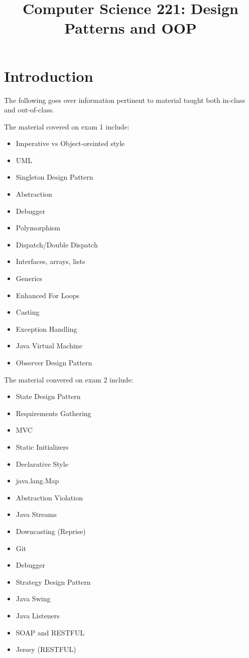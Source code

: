\documentclass[a4paper, 11pt]{article}
\begin{document}
\title{Computer Science 221: Design Patterns and OOP}

    \maketitle

\section{Introduction}

    The following goes over information pertinent to material taught both in-class and out-of-class.

    The material covered on exam 1 include:

    \begin{itemize}
        \item Imperative vs Object-oreinted style
        \item UML
        \item Singleton Design Pattern
        \item Abstraction
        \item Debugger
        \item Polymorphism
        \item Dispatch/Double Dispatch
        \item Interfaces, arrays, lists
        \item Generics
        \item Enhanced For Loops
        \item Casting
        \item Exception Handling
        \item Java Virtual Machine
        \item Observer Design Pattern
    \end{itemize}

    The material convered on exam 2 include:

    \begin{itemize}
        \item State Design Pattern
        \item Requirements Gathering
        \item MVC
        \item Static Initializers
        \item Declarative Style
        \item java.lang.Map
        \item Abstraction Violation
        \item Java Streams
        \item Downcasting (Reprise)
        \item Git
        \item Debugger
        \item Strategy Design Pattern
        \item Java Swing
        \item Java Listeners
        \item SOAP and RESTFUL
        \item Jersey (RESTFUL)
    \end{itemize}
\end{document}

